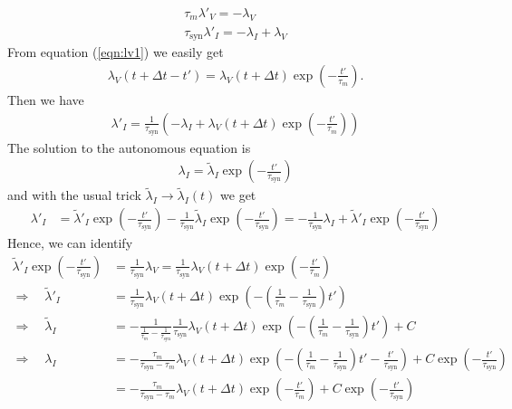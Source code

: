 \documentclass[a4paper]{article}
\begin{document}
\begin{align}
  \tau_m \lambda'_V = -\lambda_V \label{eqn:lv1} \\
  \tau_{\text{syn}} \lambda'_I = - \lambda_I + \lambda_V
\end{align}
From equation (\ref{eqn:lv1}) we easily get
\begin{align}
  \lambda_V(t+ \Delta t - t') = \lambda_V(t+\Delta t) \exp\left(-\frac{t'}{\tau_m}\right).
\end{align}
Then we have
\begin{align}
  \lambda'_I = \frac{1}{\tau_{\text{syn}}} \left(-\lambda_I +
  \lambda_V(t+\Delta t) \exp\left(-\frac{t'}{\tau_m}\right)\right)
\end{align}
The solution to the autonomous equation is
\begin{align}
  \lambda_I = \tilde{\lambda}_I \exp\left(-\frac{t'}{\tau_{\text{syn}}}\right)
\end{align}
and with the usual trick $\tilde{\lambda}_I \rightarrow
\tilde{\lambda}_I(t)$ we get
\begin{align}
  \lambda'_{I} &= \tilde{\lambda}'_I \exp\left(-\frac{t'}{\tau_{\text{syn}}}\right) - \frac{1}{\tau_{\text{syn}}} \tilde{\lambda}_I \exp\left(-\frac{t'}{\tau_{\text{syn}}}\right) = - \frac{1}{\tau_{\text{syn}}}
  \lambda_I + \tilde{\lambda}'_I \exp\left(-\frac{t'}{\tau_{\text{syn}}}\right)
\end{align}
Hence, we can identify
\begin{align}
  \tilde{\lambda}'_I \exp\left(-\frac{t'}{\tau_{\text{syn}}}\right) &= \frac{1}{\tau_{\text{syn}}}
  \lambda_V =
  \frac{1}{\tau_{\text{syn}}} \lambda_V(t+\Delta t) \exp\left(-\frac{t'}{\tau_m}\right) \\
 \Rightarrow \quad  \tilde{\lambda}'_I &= \frac{1}{\tau_{\text{syn}}}
  \lambda_V(t+\Delta t)
  \exp\left(-\left(\frac{1}{\tau_m}-\frac{1}{\tau_{\text{syn}}}\right)
  t' \right) \\
\Rightarrow \quad  \tilde{\lambda}_I &= - \frac{1}{\frac{1}{\tau_m} -
  \frac{1}{\tau_{\text{syn}}}} \frac{1}{\tau_{\text{syn}}} \lambda_V(t+\Delta t) \exp\left(-\left(\frac{1}{\tau_m}-\frac{1}{\tau_{\text{syn}}}\right)t' \right) +C \\
  \Rightarrow \quad  \lambda_I &= - \frac{\tau_m}{\tau_{\text{syn}}-\tau_m} \lambda_V(t+\Delta t) \exp\left(-\left(\frac{1}{\tau_m}-\frac{1}{\tau_{\text{syn}}}\right)
  t' - \frac{t'}{\tau_{\text{syn}}}\right) + C
  \exp\left(-\frac{t'}{\tau_{\text{syn}}}\right) \\
  &= - \frac{\tau_m}{\tau_{\text{syn}}-\tau_m} \lambda_V(t+\Delta t)
  \exp\left(-\frac{t'}{\tau_m}\right) + C
  \exp\left(-\frac{t'}{\tau_{\text{syn}}}\right) 
\end{align}
\end{document}

